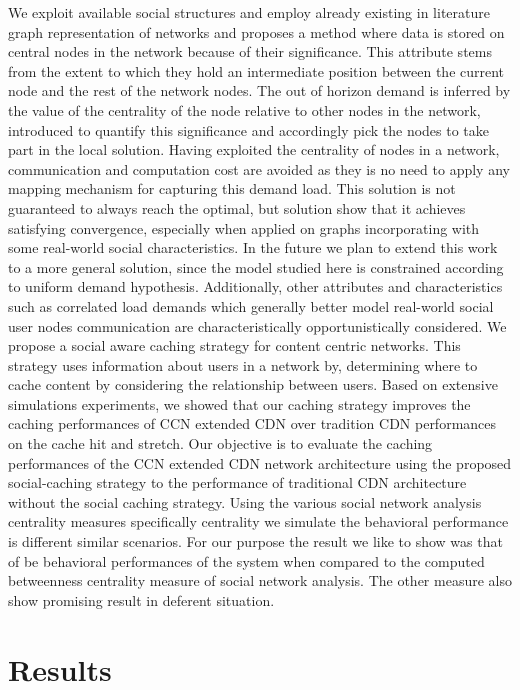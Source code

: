 We exploit available social structures and employ already existing in literature graph representation of networks and proposes a method where data is stored on central nodes in the network because of their significance. This attribute stems from the extent to which they hold an intermediate position between the current node and the rest of the network nodes. The out of horizon demand is inferred by the value of the centrality of the node relative to other nodes in the network, introduced to quantify this significance and accordingly pick the nodes to take part in the local solution. Having exploited the centrality of nodes in a network, communication and computation cost are avoided as they is no need to apply any mapping mechanism for capturing this demand load.
This solution is not guaranteed to always reach the optimal, but solution show that it achieves satisfying convergence, especially when applied on graphs incorporating with some real-world social characteristics. In the future we plan to extend this work to a more general solution, since the model studied here is constrained according to uniform demand hypothesis. Additionally, other attributes and characteristics such as correlated load demands which generally better model real-world social user nodes communication are characteristically opportunistically considered. 
We propose a social aware caching strategy for content centric networks. This strategy uses information about users in a network by, determining where to cache content by considering the relationship between users.  Based on extensive simulations experiments, we showed that our caching strategy improves the caching performances of CCN extended CDN over tradition CDN performances on the cache hit and stretch. 
Our objective is to evaluate the caching performances of the CCN extended CDN network architecture using the proposed social-caching strategy to the performance of traditional CDN architecture without the social caching strategy. Using the various social network analysis centrality measures specifically centrality we simulate the behavioral performance is different similar scenarios. For our purpose the result we like to show was that of be behavioral performances of the system when compared to the computed betweenness centrality measure of social network analysis.  The other measure also show promising result in deferent situation. 



\section{Results}

